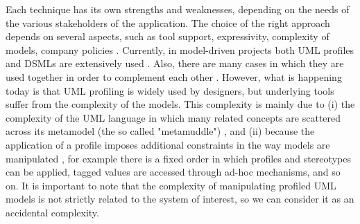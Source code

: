 Each technique has its own strengths and weaknesses, depending on the needs of the various stakeholders of the application.
The choice of the right approach depends on several aspects, such as tool support, expressivity, 
complexity of models, company policies \cite{cit}. 
Currently, in model-driven projects both UML profiles and DSMLs are extensively used \cite{cit}. 
Also, there are many cases in which they are used together in order to complement each other \cite{cit}.
However, what is happening today is that UML profiling is widely used by designers, but underlying tools suffer from the complexity of the models.
This complexity is mainly due to 
(i) the complexity of the UML language in which many related concepts are scattered across its metamodel 
(the so called "metamuddle") \cite{france}, and 
(ii) because the application of a profile imposes additional constraints in the way models are manipulated \cite{cite}, for example there is a fixed order in which profiles and stereotypes can be applied, tagged values are accessed through ad-hoc mechanisms, and so on.
It is important to note that the complexity of manipulating profiled UML models is not strictly related to
the system of interest, so we can consider it as an accidental complexity.

